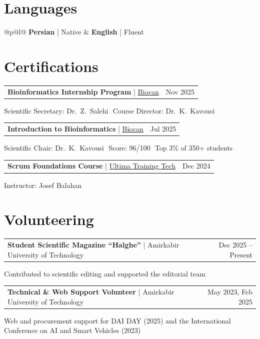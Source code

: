 \documentclass[10pt,a4paper]{article}
\makeatletter
\newlength{\entryskip}    \setlength{\entryskip}{3pt}   %
\newlength{\cvindent}     \setlength{\cvindent}{1.35em} %
\newlength{\sublinelift}  \setlength{\sublinelift}{5.3pt} %
\newlength{\sublinedrop}  \setlength{\sublinedrop}{1.3pt} %
\newlength{\labelcolw}    \setlength{\labelcolw}{5cm}   %
\newlength{\cvwidth}                                    %
\newcommand{\entrygap}{\vspace{\entryskip}}
\newcommand{\tdot}{{\color{dotcol}\,\textbullet\,\allowbreak}}
\newcommand{\cvhead}[3]{%
    \begin{tabularx}{\linewidth}{@{}Xr@{}}
        \textbf{\color{darkgray}#1}%
        \textcolor{rulecol}{\small\;|\;}%
        \textcolor{medgray}{\small #2} &
        {\small\color{lightgray}#3}
    \end{tabularx}%
}
\newcommand{\cvsublineat}[2]{%
    \setlength{\cvwidth}{\linewidth}%
    \par\nobreak\vspace{-\sublinelift}\noindent
    \hspace*{#1}%
    \parbox[t]{\dimexpr\cvwidth-#1\relax}{\small\color{lightgray}#2}%
    \par\nobreak\vspace{\sublinedrop}%
}
\newcommand{\cvsubline}[1]{\cvsublineat{\cvindent}{#1}}
\newcommand{\cvmisc}[4]{%
    \cvhead{#2}{#3}{#1}%
    \cvsubline{#4}%
    \vspace{2pt}%
}
\newcommand{\cvlang}[2]{%
    \textbf{\color{darkgray}#1}%
    \textcolor{rulecol}{\small\;|\;}%
    \textcolor{medgray}{\small #2}%
}
\makeatother
\begin{document}
\section{Languages}

\begin{tabular}{@{}p{}@{}l@{}}
    \cvlang{Persian}{Native} & \cvlang{English}{Fluent}
\end{tabular}

\section{Certifications}

\cvmisc{Nov 2025}%
       {Bioinformatics Internship Program}%
       {\href{https://drive.google.com/file/d/1Sq-hCLrasHlw_BRVucsxccK2731pjX_V/view}{Biocan}}%
       {Scientific Secretary: Dr.\ Z.\ Salehi
        \tdot Course Director: Dr.\ K.\ Kavousi}

\entrygap

\cvmisc{Jul 2025}%
       {Introduction to Bioinformatics}%
       {\href{https://drive.google.com/file/d/1wQgazces8McKTpEEtXOt706EJZTsZOQ0/view}{Biocan}}%
       {Scientific Chair: Dr.\ K.\ Kavousi
        \tdot Score: 96/100
        \tdot Top 3\% of 350+ students}

\entrygap

\cvmisc{Dec 2024}%
       {Scrum Foundations Course}%
       {\href{https://drive.google.com/file/d/1NJ5aD03rufClRxjFiiH41jTgAVAnIFnK/view}{Ultima Training Tech}}%
       {Instructor: Josef Balahan}

\section{Volunteering}

\cvmisc{Dec 2025 -- Present}%
       {Student Scientific Magazine ``Halghe''}%
       {Amirkabir University of Technology}%
       {Contributed to scientific editing and supported the editorial team}

\entrygap

\cvmisc{May 2023, Feb 2025}%
       {Technical \& Web Support Volunteer}%
       {Amirkabir University of Technology}%
       {Web and procurement support for DAI DAY (2025) and the
        International Conference on AI and Smart Vehicles (2023)}
\end{document}
